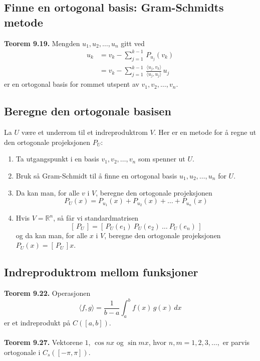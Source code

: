 \documentclass{article}
\begin{document}
\subsection{Finne en ortogonal basis: Gram-Schmidts metode}
\textbf{Teorem 9.19.} Mengden $u_1, u_2, \dots, u_n$ gitt ved
\begin{align*}
    u_k &= v_k - \sum_{j=1}^{k-1}\,P_{u_j}(v_k) \\
    &= v_k - \sum_{j=1}^{k-1}\,\frac{\langle u_j, v_k \rangle}{\langle u_j, u_j \rangle}\,u_j
\end{align*}
er en ortogonal basis for rommet utspent av $v_1, v_2, \dots, v_n$.


\subsection{Beregne den ortogonale basisen}
La $U$ være et underrom til et indreproduktrom $V$. Her er en metode for å regne ut den ortogonale projeksjonen $P_U$:
\begin{enumerate}
    \item Ta utgangspunkt i en basis $v_1, v_2, \dots, v_n$ som spenner ut $U$.
    \item Bruk så Gram-Schmidt til å finne en ortogonal basis $u_1, u_2, \dots, u_n$ for $U$.
    \item Da kan man, for alle $v$ i $V$, beregne den ortogonale projeksjonen
    \[P_U(x) = P_{u_1}(x) + P_{u_2}(x) + \dots + P_{u_n}(x) \]
    \item Hvis $V = \mathbb{R}^n$, så får vi standardmatrisen
    \[ [\, P_U \,] = [\, P_U(e_1) \ P_U(e_2) \ \dots \ P_U(e_n) \, ] \]
    og da kan man, for alle $x$ i $V$, beregne den ortogonale projeksjonen $P_U(x) = [\, P_U \,]x$.
\end{enumerate}


\subsection{Indreproduktrom mellom funksjoner}
\textbf{Teorem 9.22.} Operasjonen
\[ \langle f, g \rangle = \frac{1}{b - a} \int_a^b f(x)\,g(x)\,dx \]
er et indreprodukt på $C([a, b])$.
\\\\
\textbf{Teorem 9.27.} Vektorene $1$, $\cos{nx}$ og $\sin{mx}$, hvor $n, m = 1, 2, 3, \dots,$ er parvis ortogonale i $C_s([-\pi, \pi])$.
\end{document}
